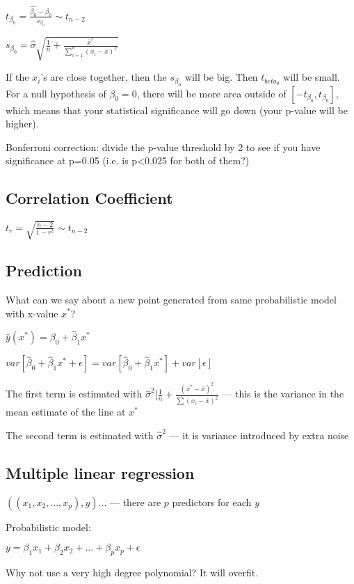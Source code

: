 \documentclass[twoside]{article}
\begin{document}
$t_{\beta_0} = \frac{\hat{\beta_0} - \beta_0}{s_{\beta_0}} \sim t_{n-2}$

$s_{\beta_0} = \hat{\sigma} \sqrt{\frac{1}{n} + \frac{\bar{x}^2}{\sum\limits_{i=1}^n (x_i - \bar{x})^2}}$

If the $x_i$'s are close together, then the $s_{\beta_0}$ will be big. Then $t_{beta_0}$ will be small. For a null hypothesis of $\beta_0 = 0$, there will be more area outside of $[-t_{\beta_0},t_{\beta_0}]$, which means that your statistical significance will go down (your p-value will be higher).

Bonferroni correction: divide the p-value threshold by 2 to see if you have significance at p=0.05 (i.e. is p<0.025 for both of them?)

\subsection{Correlation Coefficient}

$t_r = \sqrt{\frac{n-2}{1-r^2}} \sim t_{n-2}$

\subsection{Prediction}

What can we say about a new point generated from same probabilistic model with x-value $x^*$?

$\hat{y}(x^*) = \beta_0 + \hat{\beta}_1 x^*$

$var[\hat{\beta}_0 + \hat{\beta}_1 x^* + \epsilon] = var[\hat{\beta}_0 + \hat{\beta}_1x^*] + var[\epsilon]$

The first term is estimated with $\hat{\sigma}^2[\frac{1}{n} + \frac{(x^*-\bar{x})^2}{\sum(x_i-\bar{x})^2}$ --- this is the variance in the mean estimate of the line at $x^*$

The second term is estimated with $\hat{\sigma}^2$ --- it is variance introduced by extra noise

\subsection{Multiple linear regression}
$((x_1,x_2,...,x_p),y)...$ --- there are $p$ predictors for each $y$

Probabilistic model:

$y = \beta_1 x_1 + \beta_2 x_2 + ... + \beta_p x_p + \epsilon$

Why not use a very high degree polynomial? It will overfit.
\end{document}
